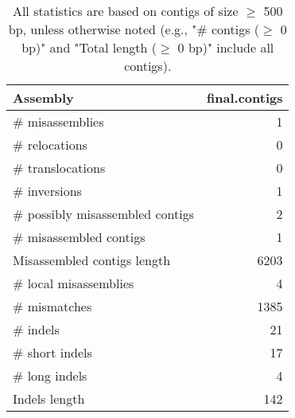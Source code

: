 \documentclass[12pt,a4paper]{article}
\begin{document}
\begin{table}[ht]
\begin{center}
\caption{All statistics are based on contigs of size $\geq$ 500 bp, unless otherwise noted (e.g., "\# contigs ($\geq$ 0 bp)" and "Total length ($\geq$ 0 bp)" include all contigs).}
\begin{tabular}{|l*{1}{|r}|}
\hline
Assembly & final.contigs \\ \hline
\# misassemblies & 1 \\ \hline
\hspace{5mm}\# relocations & 0 \\ \hline
\hspace{5mm}\# translocations & 0 \\ \hline
\hspace{5mm}\# inversions & 1 \\ \hline
\# possibly misassembled contigs & 2 \\ \hline
\# misassembled contigs & 1 \\ \hline
Misassembled contigs length & 6203 \\ \hline
\# local misassemblies & 4 \\ \hline
\# mismatches & 1385 \\ \hline
\# indels & 21 \\ \hline
\hspace{5mm}\# short indels & 17 \\ \hline
\hspace{5mm}\# long indels & 4 \\ \hline
Indels length & 142 \\ \hline
\end{tabular}
\end{center}
\end{table}
\end{document}
